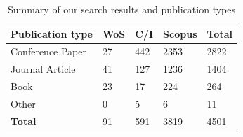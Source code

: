 \begin{table}[tb]
  \caption{Summary of our search results and publication types}
  \label{esem2019:tab:search-results}
  \centering
  \begin{tabular}{|l||lll||l|}
    \hline
    \textbf{Publication type} &
    \textbf{WoS} &
    \textbf{C/I} &
    \textbf{Scopus} &
    \textbf{Total} \\
    \hline
    \hline
    Conference Paper & 27 & 442 & 2353 & 2822 \\
    Journal Article & 41 & 127 & 1236 & 1404\\
    Book & 23 & 17 & 224 & 264\\
    Other & 0 & 5 & 6 & 11\\
    \hline
    \textbf{Total} & 91 & 591 & 3819 & 4501\\
    \hline
  \end{tabular}
\end{table}



